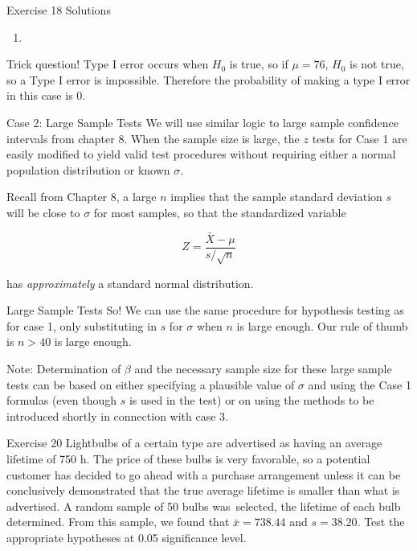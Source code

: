 \documentclass[
  ignorenonframetext,
]{beamer}
\providecommand{\tightlist}{%
  \setlength{\itemsep}{0pt}\setlength{\parskip}{0pt}}\usepackage{longtable,booktabs,array}
\begin{document}
\begin{frame}{Exercise 18 Solutions}
\protect\hypertarget{exercise-18-solutions-5}{}
\begin{enumerate}[<+->]
[a.]
\setcounter{enumi}{5}
\tightlist
\item
\end{enumerate}

Trick question! Type I error occurs when \(H_{0}\) is true, so if
\(\mu =76\), \(H_{0}\) is not true, so a Type I error is impossible.
Therefore the probability of making a type I error in this case is 0.
\end{frame}

\begin{frame}{Case 2: Large Sample Tests}
\protect\hypertarget{case-2-large-sample-tests}{}
We will use similar logic to large sample confidence intervals from
chapter 8. When the sample size is large, the \(z\) tests for Case 1 are
easily modified to yield valid test procedures without requiring either
a normal population distribution or known \(\sigma\).

Recall from Chapter 8, a large \(n\) implies that the sample standard
deviation \(s\) will be close to \(\sigma\) for most samples, so that
the standardized variable

\[
Z = \frac{\bar{X} - \mu}{s/\sqrt{n}}
\]

has \emph{approximately} a standard normal distribution.
\end{frame}

\begin{frame}{Large Sample Tests}
\protect\hypertarget{large-sample-tests}{}
So! We can use the same procedure for hypothesis testing as for case 1,
only substituting in \(s\) for \(\sigma\) when \(n\) is large enough.
Our rule of thumb is \(n > 40\) is large enough.

Note: Determination of \(\beta\) and the necessary sample size for these
large sample tests can be based on either specifying a plausible value
of \(\sigma\) and using the Case 1 formulas (even though \(s\) is used
in the test) or on using the methods to be introduced shortly in
connection with case 3.
\end{frame}

\begin{frame}{Exercise 20}
\protect\hypertarget{exercise-20}{}
Lightbulbs of a certain type are advertised as having an average
lifetime of 750 h. The price of these bulbs is very favorable, so a
potential customer has decided to go ahead with a purchase arrangement
unless it can be conclusively demonstrated that the true average
lifetime is smaller than what is advertised. A random sample of 50 bulbs
was~selected, the lifetime of each bulb determined. From this sample, we
found that \(\bar{x} = 738.44\) and \(s = 38.20\). Test the appropriate
hypotheses at 0.05 significance level.
\end{frame}
\end{document}
